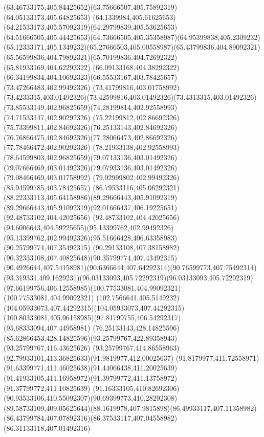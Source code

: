 {{\curveto(63.46733175,405.84425652)(63.75666507,405.75892319)(64.05133173,405.64825653)
\curveto(64.1339984,405.61625653)(64.21533173,405.57092319)(64.29799839,405.53625653)
\curveto(64.51666505,405.44425653)(64.73666505,405.35358987)(64.95399838,405.2309232)
\curveto(65.12333171,405.1349232)(65.27666503,405.00558987)(65.43799836,404.89092321)
\curveto(65.56599836,404.79892321)(65.70199836,404.72692322)(65.81933169,404.62292322)
\curveto(66.09133168,404.38292322)(66.34199834,404.10692323)(66.55533167,403.78425657)
\lineto(73.47266483,402.99492326)
\lineto(73.41799816,403.01758992)
\curveto(73.4233315,403.01492326)(73.42599816,403.01492326)(73.4313315,403.01492326)
\curveto(73.85533149,402.96825659)(74.28199814,402.92558993)(74.71533147,402.90292326)
\curveto(75.22199812,402.86692326)(75.73399811,402.84692326)(76.25133143,402.84692326)
\curveto(76.76866475,402.84692326)(77.28066473,402.86692326)(77.78466472,402.90292326)
\curveto(78.21933138,402.92558993)(78.64599803,402.96825659)(79.07133136,403.01492326)
\curveto(79.07666469,403.01492326)(79.07933136,403.01492326)(79.08466469,403.01758992)
\lineto(79.02999802,402.99492326)
\lineto(85.94599785,403.78425657)
\curveto(86.79533116,405.06292321)(88.22333113,405.64158986)(89.29666443,405.91092319)
\curveto(89.29666443,405.91092319)(92.01666437,406.19225651)(92.48733102,404.42025656)
\curveto(92.48733102,404.42025656)(94.6006643,404.59225655)(95.13399762,402.99492326)
\curveto(95.13399762,402.99492326)(95.51666428,406.63358983)(90.25799774,407.35492315)
\curveto(90.29133108,407.38158982)(90.32333108,407.40825648)(90.35799774,407.43492315)
\curveto(90.4926644,407.54158981)(90.6366644,407.64292314)(90.76599773,407.75492314)
\curveto(93.319331,409.1629231)(96.03133093,405.72292319)(96.03133093,405.72292319)
\curveto(97.66199756,406.12558985)(100.77533081,404.99092321)(100.77533081,404.99092321)
\curveto(102.7566641,405.5149232)(104.05933073,407.44292315)(104.05933073,407.44292315)
\curveto(100.80333081,405.96158985)(97.81799755,406.54292317)(95.68333094,407.44958981)
\moveto(76.25133143,428.14825596)
\curveto(85.62866453,428.14825596)(93.25799767,422.89358943)(93.25799767,416.43625626)
\curveto(93.25799767,414.86558963)(92.79933101,413.36825633)(91.9819977,412.00025637)
\curveto(91.8179977,411.72558971)(91.63399771,411.46025638)(91.44066438,411.20025639)
\curveto(91.41933105,411.16958972)(91.39799772,411.13758972)(91.37799772,411.10825639)
\curveto(91.16333105,410.82692306)(90.93533106,410.55092307)(90.69399773,410.28292308)
\curveto(89.58733109,409.05625644)(88.1619978,407.9815898)(86.49933117,407.11358982)
\curveto(86.43799784,407.07892316)(86.37533117,407.04558982)(86.31133118,407.01492316)
}}
